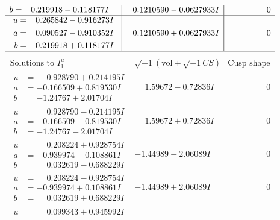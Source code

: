 \documentclass[1p]{elsarticle_modified}
\theoremstyle{definition}
\newcommand{\I}{\sqrt{-1}}
\begin{document}
$$\begin{array}{c|c|c}
\begin{aligned}
b &= \phantom{-}0.219918 - 0.118177 I\end{aligned}
 & \phantom{-}0.1210590 - 0.0627933 I & \phantom{-0.000000 } 0 \\ \hline\begin{aligned}
u &= \phantom{-}0.265842 - 0.916273 I \\
a &= \phantom{-}0.090527 - 0.910352 I \\
b &= \phantom{-}0.219918 + 0.118177 I\end{aligned}
 & \phantom{-}0.1210590 + 0.0627933 I & \phantom{-0.000000 } 0\\
 \hline 
 \end{array}$$\newpage$$\begin{array}{c|c|c}  
\text{Solutions to }I^u_{1}& \I (\text{vol} + \sqrt{-1}CS) & \text{Cusp shape}\\
 \hline 
\begin{aligned}
u &= \phantom{-}0.928790 + 0.214195 I \\
a &= -0.166509 + 0.819530 I \\
b &= -1.24767 + 2.01704 I\end{aligned}
 & \phantom{-}1.59672 - 0.72836 I & \phantom{-0.000000 } 0 \\ \hline\begin{aligned}
u &= \phantom{-}0.928790 - 0.214195 I \\
a &= -0.166509 - 0.819530 I \\
b &= -1.24767 - 2.01704 I\end{aligned}
 & \phantom{-}1.59672 + 0.72836 I & \phantom{-0.000000 } 0 \\ \hline\begin{aligned}
u &= \phantom{-}0.208224 + 0.928754 I \\
a &= -0.939974 - 0.108861 I \\
b &= \phantom{-}0.032619 - 0.688229 I\end{aligned}
 & -1.44989 - 2.06089 I & \phantom{-0.000000 } 0 \\ \hline\begin{aligned}
u &= \phantom{-}0.208224 - 0.928754 I \\
a &= -0.939974 + 0.108861 I \\
b &= \phantom{-}0.032619 + 0.688229 I\end{aligned}
 & -1.44989 + 2.06089 I & \phantom{-0.000000 } 0 \\ \hline\begin{aligned}
u &= \phantom{-}0.099343 + 0.945992 I \\

\end{aligned}
\end{array}$$
\end{document}
